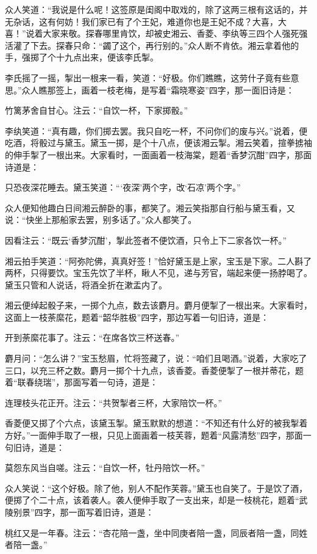 \documentclass[12pt,oneside]{book}
\begin{document}
众人笑道：“我说是什么呢！这签原是闺阁中取戏的，除了这两三根有这话的，并无杂话，这有何妨！我们家已有了个王妃，难道你也是王妃不成？大喜，大喜！”说着大家来敬。探春哪里肯饮，却被史湘云、香菱、李纨等三四个人强死强活灌了下去。探春只命：“蠲了这个，再行别的。”众人断不肯依。湘云拿着他的手，强掷了个十九点出来，便该李氏掣。

李氏摇了一摇，掣出一根来一看，笑道：“好极。你们瞧瞧，这劳什子竟有些意思。”众人瞧那签上，画着一枝老梅，是写着“霜晓寒姿”四字，那一面旧诗是：

竹篱茅舍自甘心。注云：“自饮一杯，下家掷骰。”

李纨笑道：“真有趣，你们掷去罢。我只自吃一杯，不问你们的废与兴。”说着，便吃酒，将骰过与黛玉。黛玉一掷，是个十八点，便该湘云掣。湘云笑着，揎拳掳袖的伸手掣了一根出来。大家看时，一面画着一枝海棠，题着“香梦沉酣”四字，那面诗道是：

只恐夜深花睡去。黛玉笑道：“‘夜深’两个字，改‘石凉’两个字。”

众人便知他趣白日间湘云醉卧的事，都笑了。湘云笑指那自行船与黛玉看，又说：“快坐上那船家去罢，别多话了。”众人都笑了。

因看注云：“既云‘香梦沉酣’，掣此签者不便饮酒，只令上下二家各饮一杯。”

湘云拍手笑道：“阿弥陀佛，真真好签！”恰好黛玉是上家，宝玉是下家。二人斟了两杯，只得要饮。宝玉先饮了半杯，瞅人不见，递与芳官，端起来便一扬脖喝了。黛玉只管和人说话，将酒全折在漱盂内了。

湘云便绰起骰子来，一掷个九点，数去该麝月。麝月便掣了一根出来。大家看时，这面上一枝荼縻花，题着“韶华胜极”四字，那边写着一句旧诗，道是：

开到荼縻花事了。注云：“在席各饮三杯送春。”

麝月问：“怎么讲？”宝玉愁眉，忙将签藏了，说：“咱们且喝酒。”说着，大家吃了三口，以充三杯之数。麝月一掷个十九点，该香菱。香菱便掣了一根并蒂花，题着“联春绕瑞”，那面写着一句诗，道是：

连理枝头花正开。注云：“共贺掣者三杯，大家陪饮一杯。”

香菱便又掷了个六点，该黛玉掣。黛玉默默的想道：“不知还有什么好的被我掣着方好。”一面伸手取了一根，只见上面画着一枝芙蓉，题着“风露清愁”四字，那面一句旧诗，道是：

莫怨东风当自嗟。注云：“自饮一杯，牡丹陪饮一杯。”

众人笑说：“这个好极。除了他，别人不配作芙蓉。”黛玉也自笑了。于是饮了酒，便掷了个二十点，该着袭人。袭人便伸手取了一支出来，却是一枝桃花，题着“武陵别景”四字，那一面写着旧诗，道是：

桃红又是一年春。注云：“杏花陪一盏，坐中同庚者陪一盏，同辰者陪一盏，同姓者陪一盏。”
\end{document}
